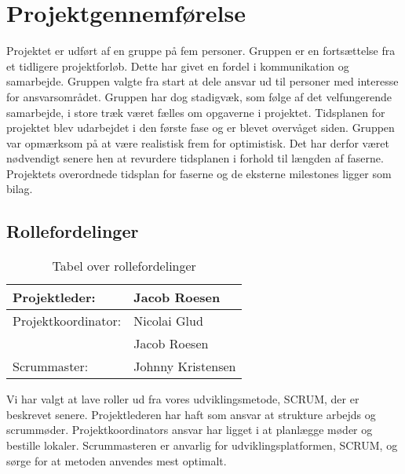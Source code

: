 \section{Projektgennemførelse}
Projektet er udført af en gruppe på fem personer. Gruppen er en fortsættelse fra et tidligere projektforløb. Dette har givet en fordel i kommunikation og samarbejde. Gruppen valgte fra start at dele ansvar ud til personer med interesse for ansvarsområdet. Gruppen har dog stadigvæk, som følge af det velfungerende samarbejde, i store træk været fælles om opgaverne i projektet.
Tidsplanen for projektet blev udarbejdet i den første fase og er blevet overvåget siden. Gruppen var opmærksom på at være realistisk frem for optimistisk. Det har derfor været nødvendigt senere hen at revurdere tidsplanen i forhold til længden af faserne.
Projektets overordnede tidsplan for faserne og de eksterne milestones ligger som bilag.
\subsection{Rollefordelinger}
\begin{table}[H]
\centering
\begin{tabular}{|l|l|} \hline
Projektleder: &Jacob Roesen\\\hline
Projektkoordinator: &Nicolai Glud\\
	&Jacob Roesen\\\hline
Scrummaster: &Johnny Kristensen\\\hline
\end{tabular}
\caption{Tabel over rollefordelinger}
\label{table:roller}
\end{table}
Vi har valgt at lave roller ud fra vores udviklingsmetode, SCRUM, der er beskrevet senere. Projektlederen har haft som ansvar at strukture arbejds og scrummøder. Projektkoordinators ansvar har ligget i at planlægge møder og bestille lokaler. Scrummasteren er anvarlig for udviklingsplatformen, SCRUM, og sørge for at metoden anvendes mest optimalt. 